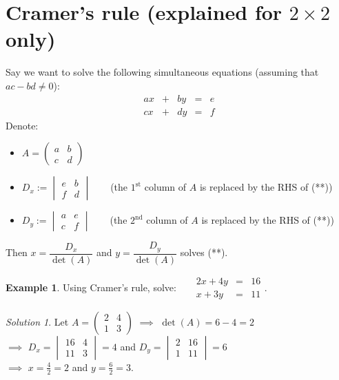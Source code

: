 \documentclass[
  12pt,
  oneside]{book}
\providecommand{\tightlist}{%
  \setlength{\itemsep}{0pt}\setlength{\parskip}{0pt}}
\theoremstyle{definition}
\theoremstyle{definition}
\newtheorem{example}{Example}[chapter]
\theoremstyle{definition}
\theoremstyle{definition}
\theoremstyle{remark}
\newtheorem*{solution}{Solution}
\begin{document}
\section{\texorpdfstring{Cramer's rule (explained for \(2\times 2\) only)}{Cramer's rule (explained for 2\textbackslash times 2 only)}}\label{cramers-rule-explained-for-2times-2-only}

Say we want to solve the following simultaneous equations (assuming that \(ac-bd\not=0\)):
\begin{equation}
\begin{matrix} ax&+&by&=&e\\ cx&+&dy&=&f\end{matrix}
\tag{\(\ast\ast\)}
\end{equation}
Denote:

\begin{itemize}
\tightlist
\item
  \(A=\begin{pmatrix}a&b\\ c&d\end{pmatrix}\)
\item
  \(D_x := \begin{vmatrix}e&b\\f&d\end{vmatrix}\) ~ ~ (the \(1^\text{st}\) column of \(A\) is replaced by the RHS of (**))
\item
  \(D_y := \begin{vmatrix}a&e\\c&f\end{vmatrix}\) ~ ~ (the \(2^\text{nd}\) column of \(A\) is replaced by the RHS of (**))
\end{itemize}

Then \(x=\dfrac{D_x}{\det(A)}\) and \(y=\dfrac{D_y}{\det(A)}\) solves (**).

\begin{example}
Using Cramer's rule, solve:
~~ \(\begin{matrix}2x+4y &=& 16\\ x+3y &=& 11\end{matrix}\).
\end{example}

\begin{solution}
Let \(A=\begin{pmatrix}2&4\\1&3\end{pmatrix}\) \(\implies\) \(\det(A)=6-4=2\)\\
\(\implies\) \(D_x=\begin{vmatrix}16&4\\11&3\end{vmatrix}=4\) and \(D_y=\begin{vmatrix}2&16\\1&11\end{vmatrix}=6\)\\
\(\implies\) \(x=\frac{4}{2}=2\) and \(y=\frac{6}{2}=3\).
\end{solution}
\end{document}
